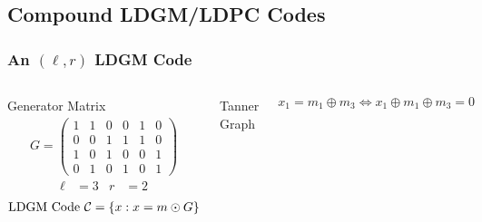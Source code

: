 \documentclass[10pt,presentation]{beamer}
\begin{document}
\subsection{Compound LDGM/LDPC Codes}
\begin{frame}\frametitle{An $(\ell,r)$ LDGM Code}
\begin{columns}
\begin{defn}{Generator Matrix}
\vspace{-3mm}
\centering
\begin{align*}
G=
\begin{pmatrix}
1 & 1 & 0 & 0 & 1 & 0\\
0 & 0 & 1 & 1 & 1 & 0\\
1 & 0 & 1 & 0 & 0 & 1\\
0 & 1 & 0 & 1 & 0 & 1  
\end{pmatrix}
\end{align*}
\begin{align*}
  \ell&=3 & r&=2
\end{align*}
\begin{align*}
\text{LDGM Code } \mathcal{C}=\{x: x=m\odot G\}
\end{align*}
\end{defn}
\begin{defn}{Tanner Graph}
\centering
\vspace{1mm}
\scalebox{0.7}{}
\end{defn}
\vspace{0.3cm}
\pause
$$ x_1=m_1\oplus m_3 \iff x_1\oplus m_1\oplus m_3=0 $$
\end{columns}
\end{frame}
\end{document}
